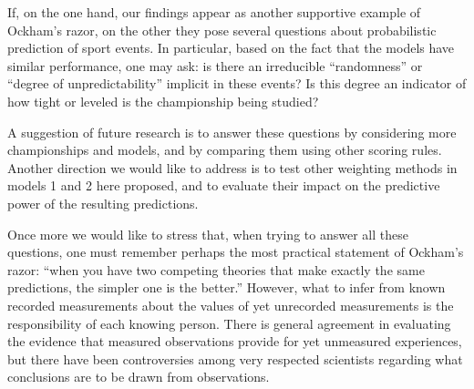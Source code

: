 \documentclass[journal,article,accept,moreauthors,pdftex,12pt,a4paper]{mdpi}
\begin{document}
    If, on the one hand, our findings appear as another supportive example of Ockham's razor, on the other they pose several questions about probabilistic prediction of sport events.
    In particular, based on the fact that the models have similar performance, one may ask: is there an irreducible ``randomness'' or ``degree of unpredictability'' implicit in these events?
    Is this degree an indicator of how tight or leveled is the championship being studied?

    A suggestion of future research is to answer these questions by considering more championships and models, and by comparing them using other scoring rules.
    Another direction we would like to address is to test other weighting methods in models 1 and 2 here
    proposed, and to evaluate their impact on the predictive power of the resulting predictions.

    Once more we would like to stress that, when trying to answer all these questions, one must remember perhaps the most practical statement of Ockham's razor: ``when you have two competing theories that make exactly the same predictions, the simpler one is the better.''
    However, what to infer from known recorded measurements about the values of yet unrecorded measurements is the responsibility of each knowing person.
    There is general agreement in evaluating the evidence that measured observations provide for yet unmeasured experiences, but there have been controversies among very respected scientists regarding what conclusions are to be drawn from observations.










    
    \makeatletter
    \renewcommand\@biblabel[1]{#1. }
    \makeatother
\end{document}
